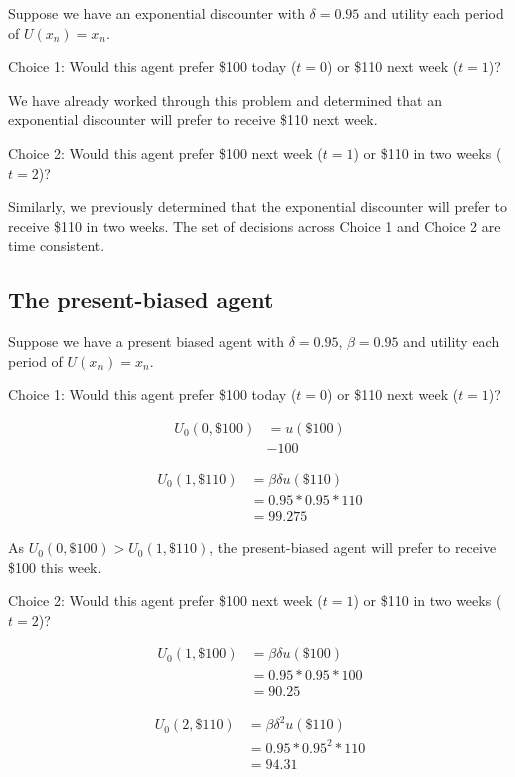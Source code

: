 \documentclass[
  letterpaper,
  DIV=11,
  numbers=noendperiod]{scrreprt}
\begin{document}
Suppose we have an exponential discounter with \(\delta=0.95\) and
utility each period of \(U(x_n)=x_n\).

Choice 1: Would this agent prefer \$100 today (\(t=0\)) or \$110 next
week (\(t=1\))?

We have already worked through this problem and determined that an
exponential discounter will prefer to receive \$110 next week.

Choice 2: Would this agent prefer \$100 next week (\(t=1\)) or \$110 in
two weeks (\(t=2\))?

Similarly, we previously determined that the exponential discounter will
prefer to receive \$110 in two weeks. The set of decisions across Choice
1 and Choice 2 are time consistent.

\hypertarget{the-present-biased-agent}{%
\subsection{The present-biased agent}\label{the-present-biased-agent}}

Suppose we have a present biased agent with \(\delta=0.95\),
\(\beta=0.95\) and utility each period of \(U(x_n)=x_n\).

Choice 1: Would this agent prefer \$100 today (\(t=0\)) or \$110 next
week (\(t=1\))?

\begin{align*}
U_0(0,\$100)&=u(\$100)\\
&-100
\end{align*}

\begin{align*}
U_0(1,\$110)&=\beta\delta u(\$110) \\
&=0.95*0.95*110 \\
&=99.275
\end{align*}

As \(U_0(0,\$100) > U_0(1,\$110)\), the present-biased agent will prefer
to receive \$100 this week.

Choice 2: Would this agent prefer \$100 next week (\(t=1\)) or \$110 in
two weeks (\(t=2\))?

\begin{align*}
U_0(1,\$100)&=\beta\delta u(\$100) \\
&=0.95*0.95*100 \\
&=90.25
\end{align*}

\begin{align*}
U_0(2,\$110)&=\beta\delta^2 u(\$110) \\
&=0.95*0.95^2*110 \\
&=94.31
\end{align*}
\end{document}

